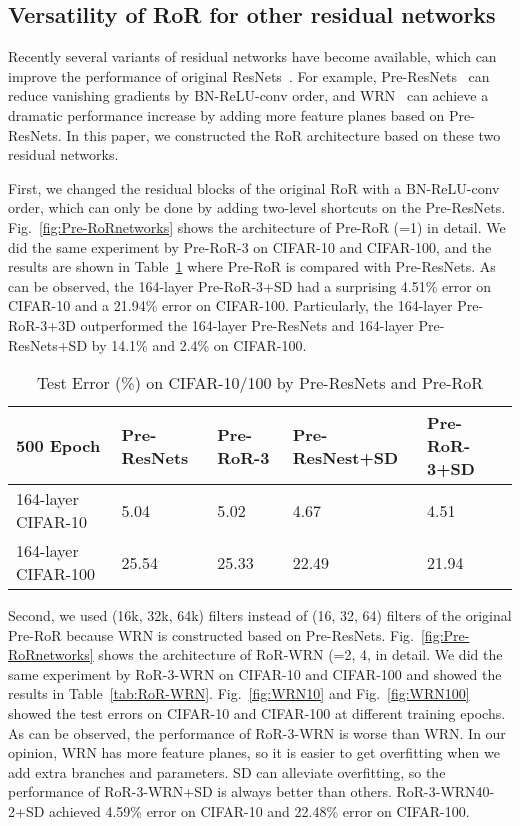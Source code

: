 \documentclass[journal]{IEEEtran}
\begin{document}
\subsection{Versatility of RoR for other residual networks}
Recently several variants of residual networks have become available, which can improve the performance of original ResNets~\cite{he2015resnets}. For example, Pre-ResNets~\cite{he2016preresnets} can reduce vanishing gradients by BN-ReLU-conv order, and WRN~\cite{zagoruyko2016wrn} can achieve a dramatic performance increase by adding more feature planes based on Pre-ResNets. In this paper, we constructed the RoR architecture based on these two residual networks. 
\par 
First, we changed the residual blocks of the original RoR with a BN-ReLU-conv order, which can only be done by adding two-level shortcuts on the Pre-ResNets. Fig.~\ref{fig:Pre-RoRnetworks} shows the architecture of Pre-RoR (=1) in detail. We did the same experiment by Pre-RoR-3 on CIFAR-10 and CIFAR-100, and the results are shown in Table~\ref{tab:Pre-RoR} where Pre-RoR is compared with Pre-ResNets. As can be observed, the 164-layer Pre-RoR-3+SD had a surprising 4.51\% error on CIFAR-10 and a 21.94\% error on CIFAR-100. Particularly, the  164-layer Pre-RoR-3+3D outperformed the 164-layer Pre-ResNets and 164-layer Pre-ResNets+SD by 14.1\% and 2.4\% on CIFAR-100. 
\begin{table}[!t]
\renewcommand{\arraystretch}{1.3}
\caption{Test Error (\%) on CIFAR-10/100 by Pre-ResNets and Pre-RoR}
\label{tab:Pre-RoR}
\centering
\begin{tabular}{|p{1.5cm}|p{1.3cm}|p{1.3cm}|p{1.3cm}|p{1.3cm}|}
\hline
500 Epoch                     &Pre-ResNets         &Pre-RoR-3       &Pre-ResNest+SD  &Pre-RoR-3+SD  \\ \hline\hline
164-layer CIFAR-10            &5.04                &5.02            &4.67            &4.51    \\\hline
164-layer CIFAR-100           &25.54               &25.33           &22.49           &21.94    \\\hline
\end{tabular}
\end{table}
\par
Second, we used (16k, 32k, 64k) filters instead of (16, 32, 64) filters of the original Pre-RoR because WRN is constructed based on Pre-ResNets. Fig.~\ref{fig:Pre-RoRnetworks} shows the architecture of RoR-WRN (=2, 4, in detail. We did the same experiment by RoR-3-WRN on CIFAR-10 and CIFAR-100 and showed the results in Table~\ref{tab:RoR-WRN}. Fig.~\ref{fig:WRN10} and Fig.~\ref{fig:WRN100} showed the test errors on CIFAR-10 and CIFAR-100 at different training epochs. As can be observed, the performance of RoR-3-WRN is worse than WRN. In our opinion, WRN has more feature planes, so it is easier to get overfitting when we add extra branches and parameters. SD can alleviate overfitting, so the performance of RoR-3-WRN+SD is always better than others. RoR-3-WRN40-2+SD achieved 4.59\% error on CIFAR-10 and 22.48\% error on CIFAR-100.
\end{document}
